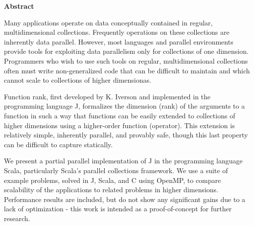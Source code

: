 %
%

\begin{center}

\bigskip

\begin{Large}
\textbf{\theTitle}
\end{Large}

\bigskip

\begin{large}
\theAuthor
\end{large}

\bigskip
\bigskip

\textbf{Abstract}

\end{center}

\noindent
Many applications operate on data conceptually contained in regular, multidimensional collections.
Frequently operations on these collections are inherently data parallel.
However, most languages and parallel environments provide tools for exploiting data parallelism only for collections of one dimension.
Programmers who wish to use such tools on regular, multidimensional collections often must write non-generalized code that can be difficult to maintain and which cannot scale to collections of higher dimensionas.

Function rank, first developed by K. Iverson and implemented in the programming language J, formalizes the dimension (rank) of the arguments to a function in such a way that functions can be easily extended to collections of higher dimensions using a higher-order function (operator).
This extension is relatively simple, inherently parallel, and provably safe, though this last property can be difficult to capture statically.

We present a partial parallel implementation of J in the programming language Scala, particularly Scala's parallel collections framework.
We use a suite of example problems, solved in J, Scala, and C using OpenMP, to compare scalability of the applications to related problems in higher dimensions.
Performance results are included, but do not show any significant gains due to a lack of optimization - this work is intended as a proof-of-concept for further research.
